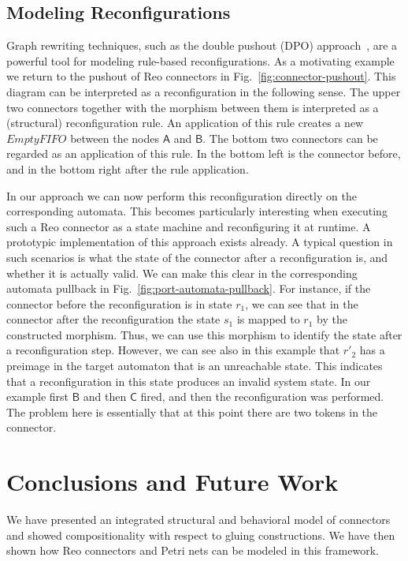 \documentclass[copyright,creativecommons]{eptcs}
\begin{document}
\subsection{Modeling Reconfigurations}

Graph rewriting techniques, such as the double pushout (DPO) approach~\cite{DPO},
are a powerful tool for modeling rule-based reconfigurations. 
As a motivating example we return to the
pushout of Reo connectors in Fig.~\ref{fig:connector-pushout}. This diagram can
be interpreted as a reconfiguration in the following sense. The upper two
connectors together with the morphism between them is interpreted as a
(structural) reconfiguration rule. An application of this rule creates a
new $EmptyFIFO$ between the nodes $\mathsf{A}$ and $\mathsf{B}$.
The bottom two connectors can be regarded as an application of this rule.
In the bottom left is the connector before, and in the bottom right after the
rule application.

In our approach we can now perform this reconfiguration directly on the
corresponding automata. This becomes particularly interesting when
executing such a Reo connector as a state machine and reconfiguring it at
runtime. A prototypic implementation of this approach exists already.
A typical question in such scenarios is what the state of the connector
after a reconfiguration is, and whether it is actually valid. 
We can make this clear in the corresponding automata pullback in
Fig.~\ref{fig:port-automata-pullback}. For instance, if the connector 
before the reconfiguration is in state $r_1$, we can see that in the 
connector after the reconfiguration the state $s_1$ is mapped to $r_1$
by the constructed morphism. Thus, we can use this morphism to identify
the state after a reconfiguration step. However, we can see also in this example
that $r'_2$ has a preimage in the target automaton that is an unreachable state.
This indicates that a reconfiguration in this state produces an invalid system
state. In our example first $\mathsf{B}$ and then $\mathsf{C}$ fired, and then
the reconfiguration was performed. The problem here is essentially that at this point
there are two tokens in the connector. 



 
\section{Conclusions and Future Work}
\label{sec:discussion}

We have presented an integrated structural and behavioral
model of connectors and showed compositionality with
respect to gluing constructions. We have then shown how Reo 
connectors and Petri nets can be modeled in this framework.
\end{document}
